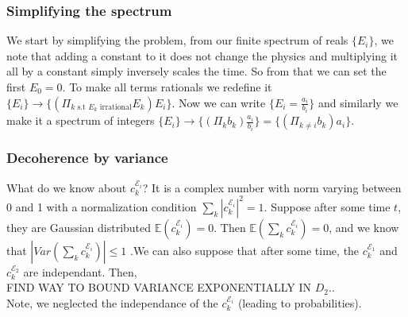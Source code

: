 \documentclass{article}
\begin{document}
\subsubsection{Simplifying the spectrum}
We start by simplifying the problem, from our finite spectrum of reals $\{E_i\}$, we note that adding a constant to it does not change the physics and multiplying it all by a constant simply inversely scales the time. So from that we can set the first $E_0=0$. To make all terms rationals we redefine it $\{E_i\}\rightarrow\{(\Pi_{k \text{ s.t } E_k\text{ irrational}}E_k)E_i\}$. Now we can write $\{E_i=\frac{a_i}{b_i}\}$ and similarly we make it a spectrum of integers $\{E_i\}\rightarrow\{(\Pi_{k}b_k)\frac{a_i}{b_i}\}=\{(\Pi_{k\neq i}b_k)a_i\}$.


\subsubsection{Decoherence by variance}
What do we know about $c^{\mathcal{E}_i}_k$? It is a complex number with norm varying between 0 and 1 with a normalization condition $\sum_k|c^{\mathcal{E}_i}_k|^2=1$. Suppose after some time $t$, they are Gaussian distributed $\mathbb{E}(c^{\mathcal{E}_i}_k)=0$. Then $\mathbb{E}(\sum_kc^{\mathcal{E}_i}_k)=0$, and we know that $|Var(\sum_kc^{\mathcal{E}_i}_k)|\leq 1$ .We can also suppose that after some time, the $c^{\mathcal{E}_1}_k$ and $c^{\mathcal{E}_2}_k$ are independant. 
Then,\\
FIND WAY TO BOUND VARIANCE EXPONENTIALLY IN $D_2$..\\
Note, we neglected the independance of the $c^{\mathcal{E}_i}_k$ (leading to probabilities).\\
\end{document}
